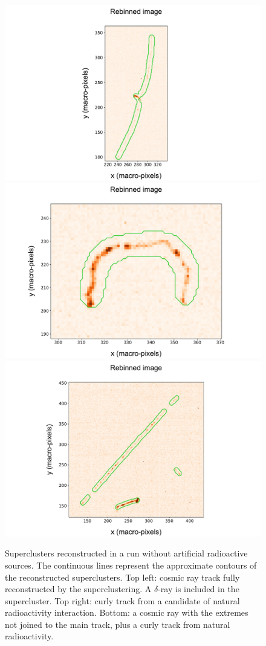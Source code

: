 %
\begin{figure}[ht]
  \begin{center}
     \includegraphics[width=0.49\linewidth]{figures/pic_run02156_ev49_sc_3D_paper}
     \includegraphics[width=0.49\linewidth]{figures/pic_run02156_ev641_sc_3D_paper} \\
     \includegraphics[width=0.6\linewidth]{figures/pic_run02156_ev631_sc_3D_paper}

     \caption{Superclusters reconstructed in a run without artificial
       radioactive sources. The continuous lines represent the
       approximate contours of the reconstructed superclusters. Top
       left: cosmic ray track fully reconstructed by the \gac
       superclustering. A $\delta$-ray is included in the
       supercluster. Top right: curly track from a candidate of
       natural radioactivity interaction. Bottom: a cosmic ray with
       the extremes not joined to the main track, plus a curly track
       from natural radioactivity. \label{fig:super_clusters2}}
       
  \end{center}
\end{figure}

